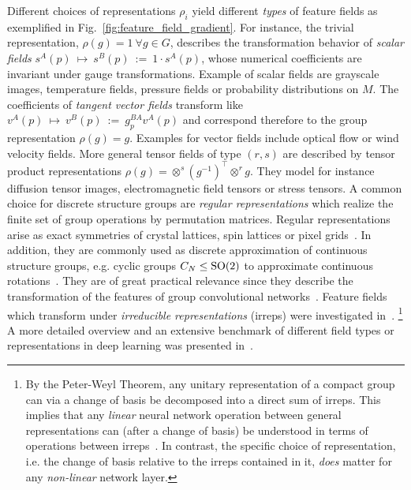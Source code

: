 Different choices of representations $\rho_i$ yield different \emph{types} of feature fields as exemplified in Fig.~\ref{fig:feature_field_gradient}.
For instance, the trivial representation, $\rho(g)=1\ \forall g\in G$, describes the transformation behavior of \emph{scalar fields} $s^A(p)\ \mapsto\ s^B(p)\ :=\ 1\cdot s^A(p)$, whose numerical coefficients are invariant under gauge transformations.
Example of scalar fields are grayscale images, temperature fields, pressure fields or probability distributions on $M$.
The coefficients of \emph{tangent vector fields} transform like $v^A(p)\ \mapsto\ v^B(p)\ :=\ g_p^{BA}v^A(p)$ and correspond therefore to the group representation $\rho(g)=g$.
Examples for vector fields include optical flow or wind velocity fields.
More general tensor fields of type $(r,s)$ are described by tensor product representations $\rho(g) = \otimes^s\left(g^{-1}\right)^{\!\top} \otimes^r g$.
They model for instance diffusion tensor images, electromagnetic field tensors or stress tensors.
A common choice for discrete structure groups are \emph{regular representations} which realize the finite set of group operations by permutation matrices.
Regular representations arise as exact symmetries of crystal lattices, spin lattices or pixel grids~\cite{Cohen2016-GCNN,Hoogeboom2018-HEX,winkels3DGCNNsPulmonary2018,Worrall2018-CUBENET,gaugeIco2019}.
In addition, they are commonly used as discrete approximation of continuous structure groups, e.g. cyclic groups $C_N\leq\operatorname{SO}(2)$ to approximate continuous rotations~\cite{Weiler2018SFCNN,bekkers2018roto,Weiler2019_E2CNN,bekkers2020bspline,Marcos2017-VFN}.
They are of great practical relevance since they describe the transformation of the features of group convolutional networks~\cite{Cohen2016-GCNN}.
Feature fields which transform under \emph{irreducible representations} (irreps) were investigated in~\cite{Worrall2017-HNET,3d_steerableCNNs,Thomas2018-TFN,Kondor2018-NBN,anderson2019cormorant,Weiler2019_E2CNN,jiang2019spherical}.%
\footnote{
\label{footnote:feature_field_irrep_decomposition}
    By the Peter-Weyl Theorem, any unitary representation of a compact group can via a change of basis be decomposed into a direct sum of irreps.
    This implies that any \emph{linear} neural network operation between general representations can (after a change of basis) be understood in terms of operations between irreps~\cite{Weiler2019_E2CNN,lang2020WignerEckart}.
    In contrast, the specific choice of representation, i.e. the change of basis relative to the irreps contained in it, \emph{does} matter for any \emph{non-linear} network layer.
}
A more detailed overview and an extensive benchmark of different field types or representations in deep learning was presented in~\cite{Weiler2019_E2CNN}.


